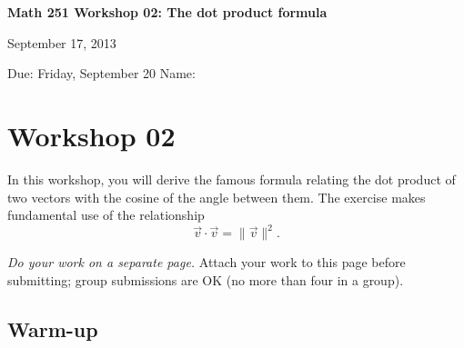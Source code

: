 \documentclass[12pt]{exam}
\theoremstyle{definition}
\begin{document}
\lstset{language=R}
\noindent
\textbf{{\large Math 251 \hfill Workshop 02: The dot product formula}}

\noindent
September 17, 2013 

\noindent
Due: Friday, September 20 \hfill Name: \underline{\hspace{3in}} 

\noindent

\section{Workshop 02}

In this workshop, you will derive the famous formula relating the dot
product of two vectors with the cosine of the angle between them. The
exercise makes fundamental use of the relationship
\[ \vec{v} \cdot \vec{v} = \lVert \vec{v} \rVert^2. \]

\emph{Do your work on a separate page.} Attach your work to this page
before submitting; group submissions are OK (no more than four in a
group).

\subsection{Warm-up}
\end{document}
